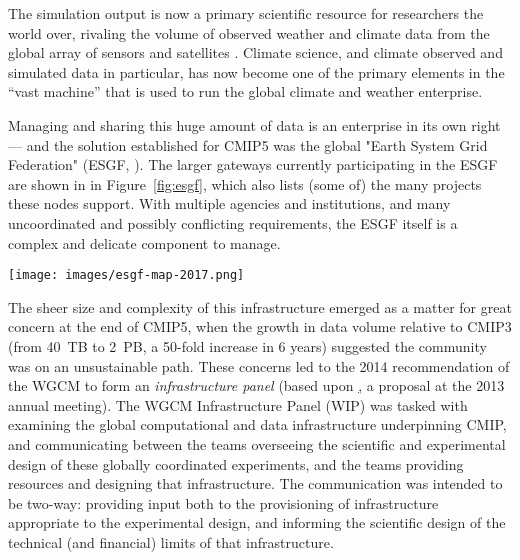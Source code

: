 \documentclass[gmd,manuscript]{copernicus}
\newcommand{\pipref}[1] {\citep{ref:#1}}
\newcommand{\figref}[1] {\mbox{Figure   \ref{fig:#1}}}
\begin{document}
The simulation output is now a primary scientific resource for
researchers the world over, rivaling the volume of 
observed weather and climate data from the global array of
sensors and satellites \pipref{overpecketal2011}. Climate science,
and climate observed and simulated data in particular, has now become 
one of the primary elements in the ``vast machine'' \pipref{edwards2010}
that is used to run the global climate and weather enterprise. 

Managing and sharing this huge amount of data is an enterprise in its
own right --- and the solution established for CMIP5 was the global
"Earth System Grid Federation" (ESGF, \pipref{williamsetal2015}). The
larger gateways currently participating in the ESGF are shown in in
\figref{esgf}, which also lists (some of) the many projects these
nodes support. With multiple agencies and institutions, and many
uncoordinated and possibly conflicting requirements, the ESGF itself
is a complex and delicate component to manage.

\begin{figure*}
  \begin{center}
    \texttt{[image: images/esgf-map-2017.png]}
  \end{center}
  \caption{Sites participating in the Earth System Grid Federation in
    2017. Figure courtesy Dean Williams, adapted from the ESGF
    Brochure. }
  \label{fig:esgf}
\end{figure*}

The sheer size and complexity of this infrastructure emerged as a
matter for great concern at the end of CMIP5, when the growth in data
volume relative to CMIP3 (from 40~TB to 2~PB, a 50-fold increase in 6
years) suggested the community was on an unsustainable path. These
concerns led to the 2014 recommendation of the WGCM to form an
\emph{infrastructure panel} (based upon \href{https://goo.gl/FHqbNN},
a proposal at the 2013 annual meeting). The WGCM Infrastructure Panel
(WIP) was tasked with examining the global computational and data
infrastructure underpinning CMIP, and communicating between the teams
overseeing the scientific and experimental design of these globally
coordinated experiments, and the teams providing resources and
designing that infrastructure. The communication was intended to be
two-way: providing input both to the provisioning of infrastructure
appropriate to the experimental design, and informing the scientific
design of the technical (and financial) limits of that infrastructure.
\end{document}
